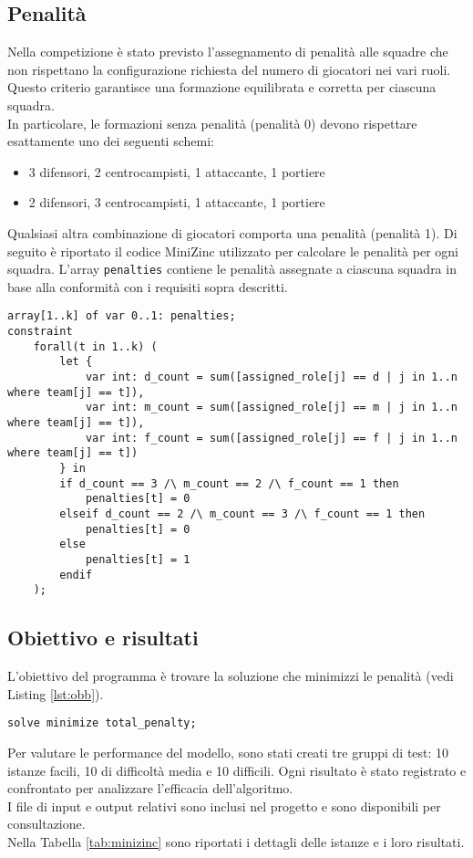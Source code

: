 \documentclass{article}
\begin{document}
\begin{multicols*}{2}
\subsection{Penalità}
Nella competizione è stato previsto l'assegnamento di penalità alle squadre che non rispettano la configurazione richiesta del numero di giocatori nei vari ruoli. Questo criterio garantisce una formazione equilibrata e corretta per ciascuna squadra. 
\\
In particolare, le formazioni senza penalità (penalità 0) devono rispettare esattamente uno dei seguenti schemi:
\begin{itemize}
    \item 3 difensori, 2 centrocampisti, 1 attaccante, 1 portiere
    \item 2 difensori, 3 centrocampisti, 1 attaccante, 1 portiere
\end{itemize} 
Qualsiasi altra combinazione di giocatori comporta una penalità (penalità 1).
Di seguito è riportato il codice MiniZinc utilizzato per calcolare le penalità per ogni squadra. L'array \texttt{penalties} contiene le penalità assegnate a ciascuna squadra in base alla conformità con i requisiti sopra descritti.
\begin{lstlisting}[style=minizinc, caption={Penalità}, label={lst:penalita}]
array[1..k] of var 0..1: penalties;
constraint
    forall(t in 1..k) (
        let {
            var int: d_count = sum([assigned_role[j] == d | j in 1..n where team[j] == t]),
            var int: m_count = sum([assigned_role[j] == m | j in 1..n where team[j] == t]),
            var int: f_count = sum([assigned_role[j] == f | j in 1..n where team[j] == t])
        } in
        if d_count == 3 /\ m_count == 2 /\ f_count == 1 then
            penalties[t] = 0
        elseif d_count == 2 /\ m_count == 3 /\ f_count == 1 then
            penalties[t] = 0
        else
            penalties[t] = 1
        endif
    );
\end{lstlisting}

\subsection{Obiettivo e risultati}

L'obiettivo del programma è trovare la soluzione che minimizzi le penalità (vedi Listing \ref{lst:obb}).

\begin{lstlisting}[style=minizinc, caption={Obiettivo del problema}, label={lst:obb}]
solve minimize total_penalty;
\end{lstlisting}
Per valutare le performance del modello, sono stati creati tre gruppi di test: 10 istanze facili, 10 di difficoltà media e 10 difficili. Ogni risultato è stato registrato e confrontato per analizzare l'efficacia dell'algoritmo.
\\
I file di input e output relativi sono inclusi nel progetto e sono disponibili per consultazione.
\\
Nella Tabella \ref{tab:minizinc} sono riportati i dettagli delle istanze e i loro risultati. 



\end{multicols*}
\end{document}
